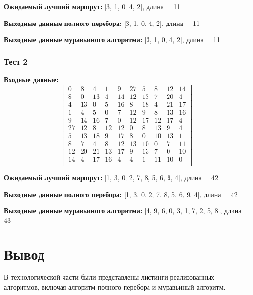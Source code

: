 \textbf{Ожидаемый лучший маршрут:} [3, 1, 0, 4, 2], длина = 11


\textbf{Выходные данные полного перебора:} [3, 1, 0, 4, 2], длина = 11


\textbf{Выходные данные муравьиного алгоритма:} [3, 1, 0, 4, 2], длина = 11

\subsubsection{Тест 2}

\textbf{Входные данные:}
\[
    \begin{bmatrix}
        0  & 8  & 4  & 1  & 9  & 27 & 5  & 8  & 12 & 14 \\
        8  & 0  & 13 & 4  & 14 & 12 & 13 & 7  & 20 & 4  \\
        4  & 13 & 0  & 5  & 16 & 8  & 18 & 4  & 21 & 17 \\
        1  & 4  & 5  & 0  & 7  & 12 & 9  & 8  & 13 & 16 \\
        9  & 14 & 16 & 7  & 0  & 12 & 17 & 12 & 17 & 4  \\
        27 & 12 & 8  & 12 & 12 & 0  & 8  & 13 & 9  & 4  \\
        5  & 13 & 18 & 9  & 17 & 8  & 0  & 10 & 13 & 1  \\
        8  & 7  & 4  & 8  & 12 & 13 & 10 & 0  & 7  & 11 \\
        12 & 20 & 21 & 13 & 17 & 9  & 13 & 7  & 0  & 10 \\
        14 & 4  & 17 & 16 & 4  & 4  & 1  & 11 & 10 & 0  \\
    \end{bmatrix}
\]


\textbf{Ожидаемый лучший маршрут:} [1, 3, 0, 2, 7, 8, 5, 6, 9, 4], длина = 42


\textbf{Выходные данные полного перебора:} [1, 3, 0, 2, 7, 8, 5, 6, 9, 4], длина = 42


\textbf{Выходные данные муравьиного алгоритма:} [4, 9, 6, 0, 3, 1, 7, 2, 5, 8], длина = 43

\section*{Вывод}

В технологической части были представлены листинги реализованных алгоритмов,
включая алгоритм полного перебора и муравьиный алгоритм.

